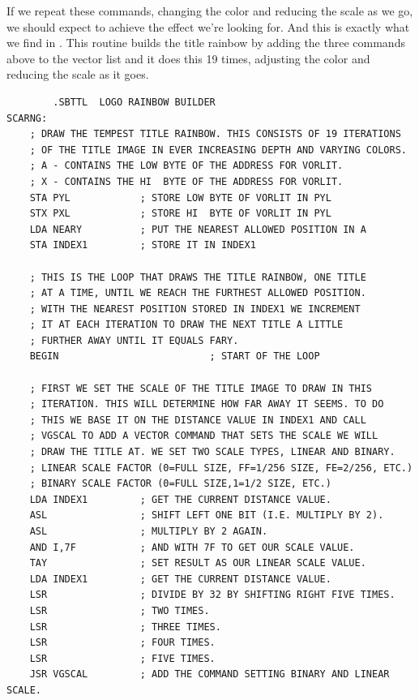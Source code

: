 If we repeat these commands, changing the color and reducing the scale as we go, we 
should expect to achieve the effect we're looking for. And this is exactly what we find
in . This routine builds the title rainbow by adding the three commands above
to the vector list and it does this 19 times, adjusting the color and reducing the scale
as it goes.
\begin{lstlisting}
        .SBTTL  LOGO RAINBOW BUILDER
SCARNG:
    ; DRAW THE TEMPEST TITLE RAINBOW. THIS CONSISTS OF 19 ITERATIONS
    ; OF THE TITLE IMAGE IN EVER INCREASING DEPTH AND VARYING COLORS.
    ; A - CONTAINS THE LOW BYTE OF THE ADDRESS FOR VORLIT.
    ; X - CONTAINS THE HI  BYTE OF THE ADDRESS FOR VORLIT.
    STA PYL            ; STORE LOW BYTE OF VORLIT IN PYL
    STX PXL            ; STORE HI  BYTE OF VORLIT IN PYL
    LDA NEARY          ; PUT THE NEAREST ALLOWED POSITION IN A
    STA INDEX1         ; STORE IT IN INDEX1
    
    ; THIS IS THE LOOP THAT DRAWS THE TITLE RAINBOW, ONE TITLE
    ; AT A TIME, UNTIL WE REACH THE FURTHEST ALLOWED POSITION.
    ; WITH THE NEAREST POSITION STORED IN INDEX1 WE INCREMENT
    ; IT AT EACH ITERATION TO DRAW THE NEXT TITLE A LITTLE
    ; FURTHER AWAY UNTIL IT EQUALS FARY.
    BEGIN                          ; START OF THE LOOP
    
    ; FIRST WE SET THE SCALE OF THE TITLE IMAGE TO DRAW IN THIS
    ; ITERATION. THIS WILL DETERMINE HOW FAR AWAY IT SEEMS. TO DO
    ; THIS WE BASE IT ON THE DISTANCE VALUE IN INDEX1 AND CALL
    ; VGSCAL TO ADD A VECTOR COMMAND THAT SETS THE SCALE WE WILL
    ; DRAW THE TITLE AT. WE SET TWO SCALE TYPES, LINEAR AND BINARY.
    ; LINEAR SCALE FACTOR (0=FULL SIZE, FF=1/256 SIZE, FE=2/256, ETC.)
    ; BINARY SCALE FACTOR (0=FULL SIZE,1=1/2 SIZE, ETC.)
    LDA INDEX1         ; GET THE CURRENT DISTANCE VALUE.
    ASL                ; SHIFT LEFT ONE BIT (I.E. MULTIPLY BY 2).
    ASL                ; MULTIPLY BY 2 AGAIN.
    AND I,7F           ; AND WITH 7F TO GET OUR SCALE VALUE.
    TAY                ; SET RESULT AS OUR LINEAR SCALE VALUE.
    LDA INDEX1         ; GET THE CURRENT DISTANCE VALUE.
    LSR                ; DIVIDE BY 32 BY SHIFTING RIGHT FIVE TIMES.
    LSR                ; TWO TIMES.
    LSR                ; THREE TIMES.
    LSR                ; FOUR TIMES.
    LSR                ; FIVE TIMES.
    JSR VGSCAL         ; ADD THE COMMAND SETTING BINARY AND LINEAR SCALE.
    

\end{lstlisting}
